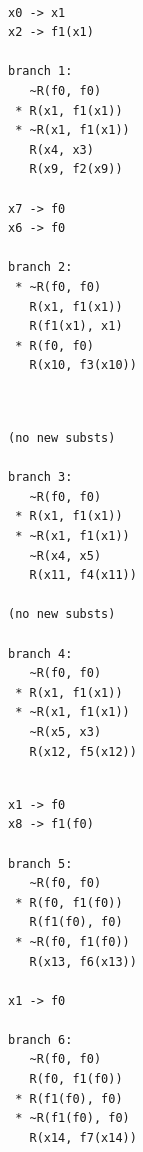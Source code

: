 \documentclass[a4paper,notitlepage]{scrartcl}
\begin{document}
\begin{minipage}[t]{.3\textwidth}
\begin{verbatim}

x0 -> x1
x2 -> f1(x1)

branch 1:
   ~R(f0, f0)
 * R(x1, f1(x1))
 * ~R(x1, f1(x1))
   R(x4, x3)
   R(x9, f2(x9))

x7 -> f0
x6 -> f0

branch 2:
 * ~R(f0, f0)
   R(x1, f1(x1))
   R(f1(x1), x1)
 * R(f0, f0)
   R(x10, f3(x10))
\end{verbatim}
\end{minipage}
\begin{minipage}[t]{.3\textwidth}
\begin{verbatim}


(no new substs) 

branch 3:
   ~R(f0, f0)
 * R(x1, f1(x1))
 * ~R(x1, f1(x1))
   ~R(x4, x5)
   R(x11, f4(x11))

(no new substs)

branch 4:
   ~R(f0, f0)
 * R(x1, f1(x1))
 * ~R(x1, f1(x1))
   ~R(x5, x3)
   R(x12, f5(x12))
\end{verbatim}
\end{minipage}
\begin{minipage}[t]{.3\textwidth}
\begin{verbatim}

x1 -> f0
x8 -> f1(f0)

branch 5:
   ~R(f0, f0)
 * R(f0, f1(f0))
   R(f1(f0), f0)
 * ~R(f0, f1(f0))
   R(x13, f6(x13))

x1 -> f0

branch 6:
   ~R(f0, f0)
   R(f0, f1(f0))
 * R(f1(f0), f0)
 * ~R(f1(f0), f0)
   R(x14, f7(x14))
\end{verbatim}

\end{minipage}
\
\end{document}
